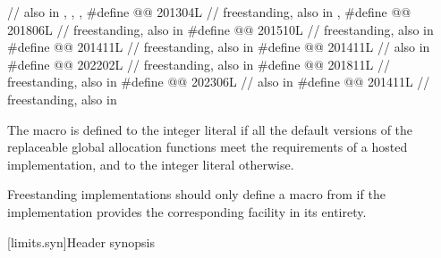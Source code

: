 \begin{codeblock}
  // also in , , , 
#define @@                    201304L // freestanding, also in , 
#define @@                     201806L // freestanding, also in 
#define @@     201510L // freestanding, also in 
#define @@               201411L // freestanding, also in 
#define @@         201411L // also in 
#define @@                       202202L // freestanding, also in 
#define @@                        201811L // freestanding, also in 
#define @@                           202306L // also in 
#define @@                            201411L // freestanding, also in 
\end{codeblock}

\pnum
The macro  is defined to
the integer literal 
if all the default versions of the replaceable global allocation functions meet
the requirements of a hosted implementation, and
to the integer literal  otherwise.

\pnum
\recommended
Freestanding implementations should only define a macro from 
if the implementation provides the corresponding facility in its entirety.

[limits.syn]{Header  synopsis}

%
%
%
%

